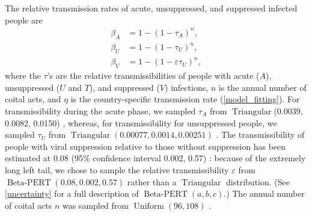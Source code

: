 \documentclass{article}
\DeclareMathOperator{\Uniform}{Uniform}
\DeclareMathOperator{\Triangular}{Triangular}
\DeclareMathOperator{\BetaPERT}{Beta-PERT}
\begin{document}
The relative transmission rates of acute, unsuppressed, and suppressed
infected people are
\begin{equation}
  \label{betas}
  \begin{split}
    \beta_A &= 1 - (1 - \tau_A)^n,
    \\
    \beta_U &= 1 - (1 - \tau_U)^n,
    \\
    \beta_V &= 1 - (1 - \varepsilon \tau_U)^n,
  \end{split}
\end{equation}
where the $\tau$'s are the relative transmissibilities of people with
acute ($A$), unsuppressed ($U$ and $T$), and suppressed ($V$)
infections, $n$ is the annual number of coital acts, and $\eta$ is the
country-specific transmission rate (\autoref{model_fitting}).  For
transmissibility during the acute phase, we sampled $\tau_A$ from
$\Triangular$(0.0039, 0.0082, 0.0150)
\cite{Wawer2005-us, Skarbinski2015-ni}, whereas, for transmissibility
for unsuppressed people, we sampled $\tau_U$ from
$\Triangular(0.00077, 0.0014, 0.00251)$ \cite{Hughes2012-so}.  The
transmissibility of people with viral suppression relative to those
without suppression has been estimated at 0.08 (95\% confidence
interval 0.002, 0.57) \cite{Donnell2010-xo}: because of the extremely
long left tail, we chose to sample the relative transmissibility
$\varepsilon$ from $\BetaPERT(0.08, 0.002, 0.57)$ rather than a
$\Triangular$ distribution.  (See \autoref{uncertainty} for a full
description of $\BetaPERT(a, b, c)$.)  The annual number of coital
acts $n$ was sampled from $\Uniform(96, 108)$
\cite{Wawer2005-us, Abdool_Karim2010-cm}.
\end{document}

